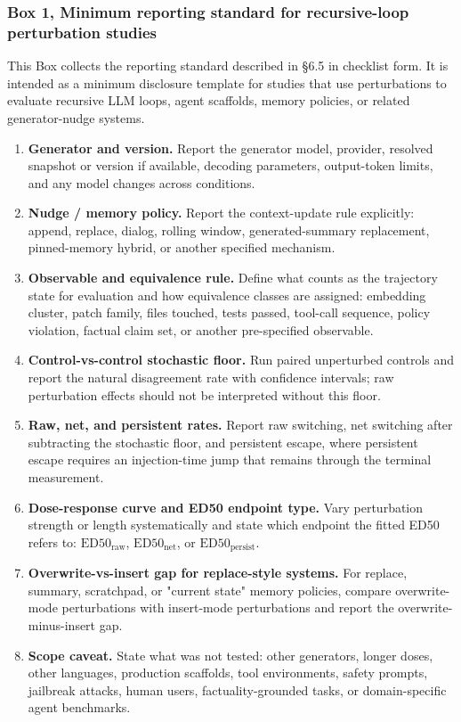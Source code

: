\documentclass{article}
\theoremstyle{plain}
\theoremstyle{definition}
\begin{document}
\subsubsection*{Box 1, Minimum reporting standard for recursive-loop perturbation studies}

This Box collects the reporting standard described in §6.5 in checklist form. It is intended as a minimum disclosure template for studies that use perturbations to evaluate recursive LLM loops, agent scaffolds, memory policies, or related generator-nudge systems.

\begin{enumerate}
  \item \textbf{Generator and version.} Report the generator model, provider, resolved snapshot or version if available, decoding parameters, output-token limits, and any model changes across conditions.

  \item \textbf{Nudge / memory policy.} Report the context-update rule explicitly: append, replace, dialog, rolling window, generated-summary replacement, pinned-memory hybrid, or another specified mechanism.

  \item \textbf{Observable and equivalence rule.} Define what counts as the trajectory state for evaluation and how equivalence classes are assigned: embedding cluster, patch family, files touched, tests passed, tool-call sequence, policy violation, factual claim set, or another pre-specified observable.

  \item \textbf{Control-vs-control stochastic floor.} Run paired unperturbed controls and report the natural disagreement rate with confidence intervals; raw perturbation effects should not be interpreted without this floor.

  \item \textbf{Raw, net, and persistent rates.} Report raw switching, net switching after subtracting the stochastic floor, and persistent escape, where persistent escape requires an injection-time jump that remains through the terminal measurement.

  \item \textbf{Dose-response curve and ED50 endpoint type.} Vary perturbation strength or length systematically and state which endpoint the fitted ED50 refers to: $\mathrm{ED50}_{\mathrm{raw}}$, $\mathrm{ED50}_{\mathrm{net}}$, or $\mathrm{ED50}_{\mathrm{persist}}$.

  \item \textbf{Overwrite-vs-insert gap for replace-style systems.} For replace, summary, scratchpad, or "current state" memory policies, compare overwrite-mode perturbations with insert-mode perturbations and report the overwrite-minus-insert gap.

  \item \textbf{Scope caveat.} State what was not tested: other generators, longer doses, other languages, production scaffolds, tool environments, safety prompts, jailbreak attacks, human users, factuality-grounded tasks, or domain-specific agent benchmarks.
\end{enumerate}
\end{document}
